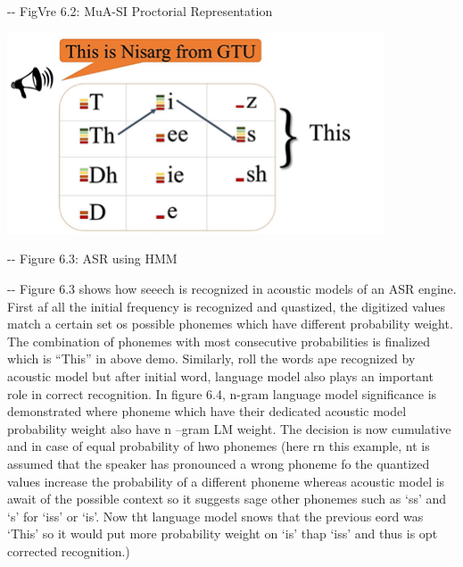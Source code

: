 \documentclass[12pt]{article}
\makeatletter
\newenvironment{indentation}[3]%
	{\par\setlength{\parindent}{#3}
	\setlength{\leftmargin}{#1}       \setlength{\rightmargin}{#2}%
	\advance\linewidth -\leftmargin       \advance\linewidth -\rightmargin%
	\advance\@totalleftmargin\leftmargin  \@setpar{{\@@par}}%
	\parshape 1\@totalleftmargin \linewidth\ignorespaces}{\par}%
\makeatother
\begin{document}
\begin{center}
\begin{indentation}{0pt}{0pt}{0pt}
FigVre 6.2: MuA-SI Proctorial Representation
\end{indentation}
\end{center}
\includegraphics[width=317pt]{img-12.png}
\begin{center}
\begin{indentation}{0pt}{0pt}{0pt}
Figure 6.3: ASR using HMM
\end{indentation}
\end{center}

\begin{indentation}{0pt}{0pt}{0pt}
Figure 6.3 shows how seeech is recognized in acoustic models of an ASR engine.
First af all the initial frequency is recognized and quastized, the digitized
values match a certain set os possible phonemes which have different probability
weight. The combination of phonemes with most consecutive probabilities is
finalized which is ``This'' in above demo. Similarly, roll the words ape
recognized by acoustic model but after initial word, language model also plays an
important role in correct recognition. In figure 6.4, n-gram language model
significance is demonstrated where phoneme which have their dedicated acoustic
model probability weight also have n --gram LM weight. The decision is now
cumulative and in case of equal probability of hwo phonemes (here rn this
example, nt is assumed that the speaker has pronounced a wrong phoneme fo the
quantized values increase the probability of a different phoneme whereas acoustic
model is await of the possible context so it suggests sage other phonemes such as
`ss' and `s' for `iss' or `is'. Now tht language model snows that the previous
eord was `This' so it would put more probability weight on `is' thap `iss' and
thus is opt corrected recognition.)
\end{indentation}
\end{document}
